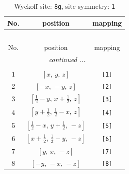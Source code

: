 \documentclass[fleqn,8pt]{jsarticle}
\begin{document}
\renewcommand{\arraystretch}{1.2}
\begin{longtable}{ccc}
\caption{Wyckoff site: {\tt 8g}, site symmetry: {\tt 1}}
 \\
 \hline \hline
No. & position & mapping \\ \hline \endfirsthead

\multicolumn{2}{l}{\tablename\ \thetable{}} \\
 \hline \hline
No. & position & mapping \\ \hline \endhead

 \hline \hline
\multicolumn{2}{r}{\footnotesize\it continued ...} \\ \endfoot

 \hline \hline
\multicolumn{2}{r}{} \\ \endlastfoot

1 & $\left[ x,\, y,\, z \right]$ & {\tt [1]} \\ \hline
2 & $\left[ - x,\, - y,\, z \right]$ & {\tt [2]} \\ \hline
3 & $\left[ \frac{1}{2} - y,\, x + \frac{1}{2},\, z \right]$ & {\tt [3]} \\ \hline
4 & $\left[ y + \frac{1}{2},\, \frac{1}{2} - x,\, z \right]$ & {\tt [4]} \\ \hline
5 & $\left[ \frac{1}{2} - x,\, y + \frac{1}{2},\, - z \right]$ & {\tt [5]} \\ \hline
6 & $\left[ x + \frac{1}{2},\, \frac{1}{2} - y,\, - z \right]$ & {\tt [6]} \\ \hline
7 & $\left[ y,\, x,\, - z \right]$ & {\tt [7]} \\ \hline
8 & $\left[ - y,\, - x,\, - z \right]$ & {\tt [8]} \\
\end{longtable}
\end{document}
